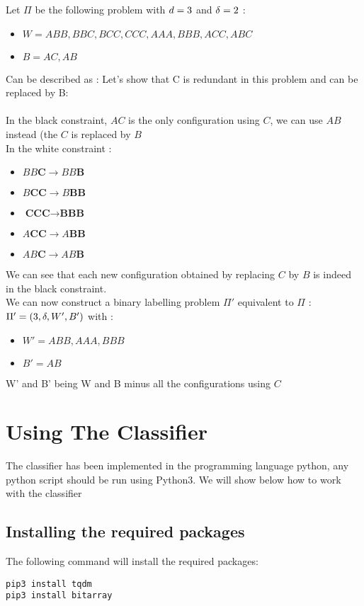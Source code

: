 \begin{exmp}
Let $\Pi$ be the following problem with $d = 3$ and $\delta = 2$ :
\begin{itemize}
    \item $W = ABB, BBC, BCC, CCC, AAA, BBB, ACC, ABC$
    \item $B = AC, AB$
\end{itemize}
Can be described as :
Let's show that C is redundant in this problem and can be replaced by B:\\\\
In the black constraint, $AC$ is the only configuration using $C$, we can use $AB$ instead (the $C$ is replaced by $B$\\
In the white constraint :
\begin{itemize}
    \item $BB\textbf{C} \rightarrow BB\textbf{B}$
    \item $B\textbf{CC} \rightarrow B\textbf{BB}$
    \item $\textbf{CCC} \rightarrow \textbf{BBB}$
    \item $A\textbf{CC} \rightarrow A\textbf{BB}$
    \item $AB\textbf{C} \rightarrow AB\textbf{B}$
\end{itemize}
We can see that each new configuration obtained by replacing $C$ by $B$ is indeed in the black constraint.\\
We can now construct a binary labelling problem $\Pi'$ equivalent to $\Pi$ :\\
$\Pi'=(3,\delta,W',B')$ with :
\begin{itemize}
    \item $W' = ABB, AAA, BBB$
    \item $B' = AB$
\end{itemize}
W' and B' being W and B minus all the configurations using $C$
\end{exmp}
\section{Using The Classifier}
The classifier has been implemented in the programming language python, any python script should be run using Python3. We will show below how to work with the classifier
\subsection{Installing the required packages}
The following command will install the required packages:
\begin{lstlisting}
pip3 install tqdm
pip3 install bitarray
\end{lstlisting}
